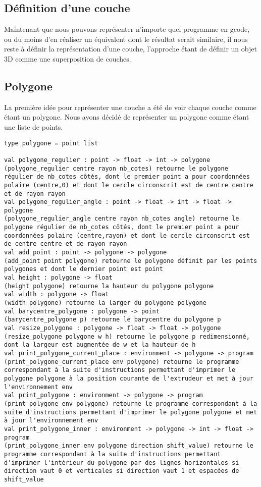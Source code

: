 \documentclass[11pt, titlepage]{article}
\begin{document}
\subsection{Définition d'une couche}
Maintenant que nous pouvons représenter n'importe quel programme en gcode, ou du moins d'en réaliser un équivalent dont le résultat serait similaire, il nous reste à définir la représentation d'une couche, l'approche étant de définir un objet 3D comme une superposition de couches.

\subsection{Polygone}
La première idée pour représenter une couche a été de voir chaque couche comme étant un polygone. Nous avons décidé de représenter un polygone comme étant une liste de points.

\begin{lstlisting}
type polygone = point list
	    
val polygone_regulier : point -> float -> int -> polygone
(polygone_regulier centre rayon nb_cotes) retourne le polygone régulier de nb_cotes côtés, dont le premier point a pour coordonnées polaire (centre,0) et dont le cercle circonscrit est de centre centre et de rayon rayon
val polygone_regulier_angle : point -> float -> int -> float -> polygone
(polygone_regulier_angle centre rayon nb_cotes angle) retourne le polygone régulier de nb_cotes côtés, dont le premier point a pour coordonnées polaire (centre,rayon) et dont le cercle circonscrit est de centre centre et de rayon rayon
val add point : point -> polygone -> polygone
(add_point point polygone) retourne le polygone définit par les points polygones et dont le dernier point est point
val height : polygone -> float
(height polygone) retourne la hauteur du polygone polygone
val width : polygone -> float
(width polygone) retourne la larger du polygone polygone
val barycentre_polygone : polygone -> point
(barycentre_polygone p) retourne le barycentre du polygone p
val resize_polygone : polygone -> float -> float -> polygone 
(resize_polygone polygone w h) retourne le polygone p redimensionné, dont la largeur est augmentée de w et la hauteur de h
val print_polygone_current_place : environment -> polygone -> program
(print_polygone_current_place env polygone) retourne le programme correspondant à la suite d'instructions permettant d'imprimer le polygone polygone à la position courante de l'extrudeur et met à jour l'environnement env
val print_polygone : environment -> polygone -> program
(print_polygone env polygone) retourne le programme correspondant à la suite d'instructions permettant d'imprimer le polygone polygone et met à jour l'environnement env
val print_polygone_inner : environment -> polygone -> int -> float -> program
(print_polygone_inner env polygone direction shift_value) retourne le programme correspondant à la suite d'instructions permettant d'imprimer l'intérieur du polygone par des lignes horizontales si direction vaut 0 et verticales si direction vaut 1 et espacées de shift_value
\end{lstlisting}
\end{document}
